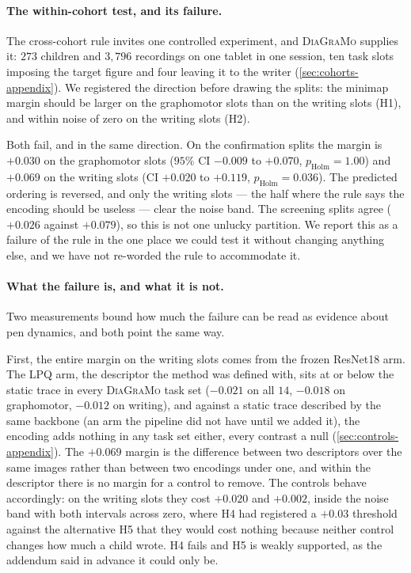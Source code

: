 \documentclass[10pt,a4paper]{article}
\begin{document}


\paragraph{The within-cohort test, and its failure.} The cross-cohort rule invites one controlled
experiment, and \textsc{DiaGraMo} supplies it: $273$ children and $3{,}796$ recordings on one
tablet in one session, ten task slots imposing the target figure and four leaving it to the writer
(\cref{sec:cohorts-appendix}). We registered the direction before drawing
the splits: the minimap margin should be larger on the graphomotor slots than on the writing slots
(H1), and within noise of zero on the writing slots (H2).

Both fail, and in the same direction. On the confirmation splits the margin is $+0.030$ on the
graphomotor slots ($95\%$ CI $-0.009$ to $+0.070$, $p_{\text{Holm}} = 1.00$) and $+0.069$ on the
writing slots (CI $+0.020$ to $+0.119$, $p_{\text{Holm}} = 0.036$). The predicted ordering is
reversed, and only the writing slots --- the half where the rule says the encoding should be
useless --- clear the noise band. The screening splits agree ($+0.026$ against $+0.079$), so this is
not one unlucky partition. We report this as a failure of the rule in the one place we could test
it without changing anything else, and we have not re-worded the rule to accommodate it.

\paragraph{What the failure is, and what it is not.} Two measurements bound how much the failure
can be read as evidence about pen dynamics, and both point the same way.

First, the entire margin on the writing slots comes from the frozen ResNet18 arm. The LPQ arm, the
descriptor the method was defined with, sits at or below the static trace in every
\textsc{DiaGraMo} task set ($-0.021$ on all $14$, $-0.018$ on graphomotor, $-0.012$ on writing), and
against a static trace described by the same backbone (an arm the pipeline did not have until we
added it), the encoding adds nothing in any task set either, every contrast a null
(\cref{sec:controls-appendix}). The $+0.069$ margin is the difference between two descriptors over
the same images rather than between two encodings under one, and within the descriptor there is no
margin for a control to remove. The controls behave accordingly: on the writing slots they cost
$+0.020$ and $+0.002$, inside the noise band with both intervals across zero, where H4 had
registered a $+0.03$ threshold against the alternative H5 that they would cost nothing because
neither control changes how much a child wrote. H4 fails and H5 is weakly supported, as the addendum
said in advance it could only be.
\end{document}
